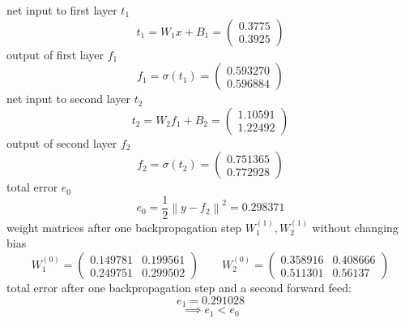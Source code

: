 \documentclass[a4paper,fleqn]{article}
\begin{document}
  net input to first layer $t_1$
  \[
    t_1 = W_1 x + B_1 =
    \begin{pmatrix}
      0.3775 \\ 0.3925
    \end{pmatrix}
  \]
  output of first layer $f_1$
  \[
    f_1 = \sigma (t_1) =
    \begin{pmatrix}
      0.593270 \\ 0.596884
    \end{pmatrix}
  \]
  net input to second layer $t_2$
  \[
    t_2 = W_2 f_1 + B_2 =
    \begin{pmatrix}
      1.10591 \\ 1.22492
    \end{pmatrix}
  \]
  output of second layer $f_2$
  \[
    f_2 = \sigma (t_2) =
    \begin{pmatrix}
      0.751365 \\ 0.772928
    \end{pmatrix}
  \]
  total error $e_0$
  \[
    e_0 = \frac{1}{2} \left\| y - f_2 \right\|^2 = 0.298371
  \]
  weight matrices after one backpropagation step $W^{(1)}_1, W^{(1)}_2$ without changing bias
  \[
    W^{(0)}_1 =
    \begin{pmatrix}
      0.149781 & 0.199561 \\
      0.249751 & 0.299502
    \end{pmatrix}
    \qquad
    W^{(0)}_2 =
    \begin{pmatrix}
      0.358916 & 0.408666 \\
      0.511301 & 0.56137
    \end{pmatrix}
  \]
  total error after one backpropagation step and a second forward feed:
  \[
    e_1 = 0.291028
  \]
  \[
    \implies e_1 < e_0
  \]
\end{document}
